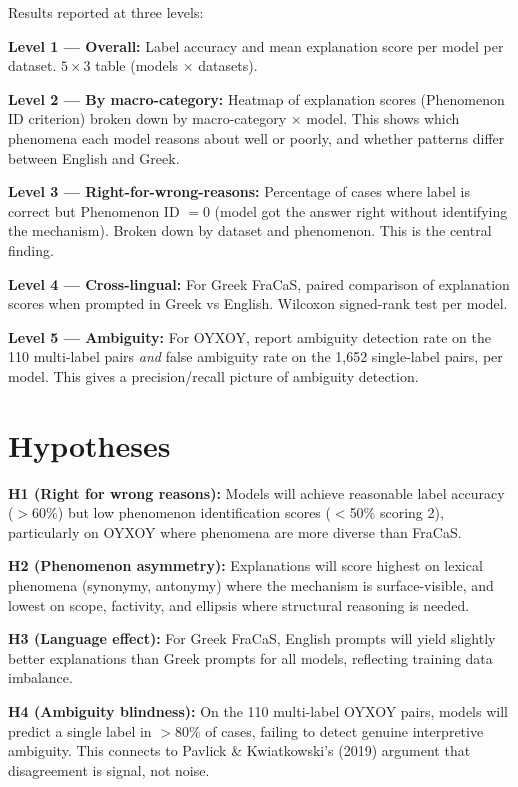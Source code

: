 \documentclass[11pt,a4paper]{article}
\begin{document}
Results reported at three levels:

\textbf{Level 1 --- Overall:} Label accuracy and mean explanation score per model per dataset. $5 \times 3$ table (models $\times$ datasets).

\textbf{Level 2 --- By macro-category:} Heatmap of explanation scores (Phenomenon ID criterion) broken down by macro-category $\times$ model. This shows which phenomena each model reasons about well or poorly, and whether patterns differ between English and Greek.

\textbf{Level 3 --- Right-for-wrong-reasons:} Percentage of cases where label is correct but Phenomenon ID $= 0$ (model got the answer right without identifying the mechanism). Broken down by dataset and phenomenon. This is the central finding.

\textbf{Level 4 --- Cross-lingual:} For Greek FraCaS, paired comparison of explanation scores when prompted in Greek vs English. Wilcoxon signed-rank test per model.

\textbf{Level 5 --- Ambiguity:} For OYXOY, report ambiguity detection rate on the 110 multi-label pairs \emph{and} false ambiguity rate on the 1,652 single-label pairs, per model. This gives a precision/recall picture of ambiguity detection.

\section{Hypotheses}

\textbf{H1 (Right for wrong reasons):} Models will achieve reasonable label accuracy ($>$60\%) but low phenomenon identification scores ($<$50\% scoring 2), particularly on OYXOY where phenomena are more diverse than FraCaS.

\textbf{H2 (Phenomenon asymmetry):} Explanations will score highest on lexical phenomena (synonymy, antonymy) where the mechanism is surface-visible, and lowest on scope, factivity, and ellipsis where structural reasoning is needed.

\textbf{H3 (Language effect):} For Greek FraCaS, English prompts will yield slightly better explanations than Greek prompts for all models, reflecting training data imbalance.

\textbf{H4 (Ambiguity blindness):} On the 110 multi-label OYXOY pairs, models will predict a single label in $>$80\% of cases, failing to detect genuine interpretive ambiguity. This connects to Pavlick \& Kwiatkowski's (2019) argument that disagreement is signal, not noise.
\end{document}
